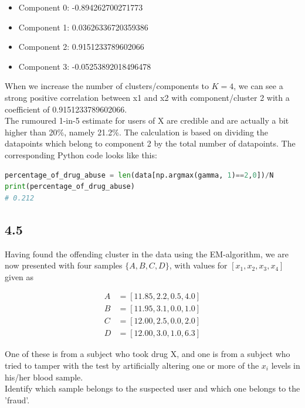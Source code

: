 \documentclass[a4paper]{article}
\begin{document}
\begin{itemize}
	\item Component 0: -0.894262700271773
	\item Component 1: 0.03626336720359386
	\item Component 2: 0.9151233789602066
	\item Component 3: -0.05253892018496478
\end{itemize}


When we increase the number of clusters/components to $K = 4$, we can see a strong positive correlation between x1 and x2 with component/cluster 2 with a coefficient of 0.9151233789602066.\\


The rumoured 1-in-5 estimate for users of X are credible and are actually a bit higher than 20\%, namely 21.2\%. The calculation is based on dividing the datapoints which belong to component 2 by the total number of datapoints. The corresponding Python code looks like this:

\begin{lstlisting}[language=Python]
percentage_of_drug_abuse = len(data[np.argmax(gamma, 1)==2,0])/N
print(percentage_of_drug_abuse)
# 0.212
\end{lstlisting}

\subsection*{4.5}

Having found the offending cluster in the data using the EM-algorithm, we are now presented with four samples $\{ A, B, C, D\}$, with values for $[x_1, x_2, x_3, x_4]$ given as 

\begin{align*}
A &= [11.85, 2.2, 0.5, 4.0]\\
B &= [11.95, 3.1, 0.0, 1.0]\\
C &= [12.00, 2.5, 0.0, 2.0]\\
D &= [12.00, 3.0, 1.0, 6.3]
\end{align*}

One of these is from a subject who took drug X, and one is from a subject who tried to tamper with the test by artificially altering one or more of the $x_i$ levels in his/her blood sample.\\

Identify which sample belongs to the suspected user and which one belongs to the 'fraud'.\\
\end{document}
